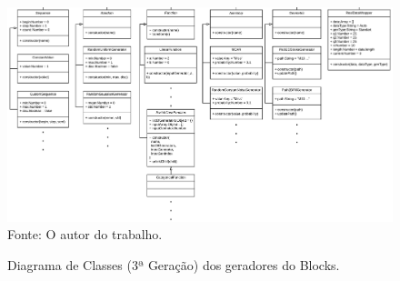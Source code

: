 \documentclass[
	12pt,				%
	openright,			%
	oneside,			%
	a4paper,			%
	english,			%
	brazil				%
	]{abntex2}
\begin{document}
	\begin{figure}[h!]
		\centering
		\caption{Diagrama de Classes (3ª Geração) dos geradores do Blocks.}
		\includegraphics[width=\linewidth]{./figures/prototipo/DiagramadeClasseGeradoresBaixo.png}
		\label{fig:diagramaCDBaixo}
		\footnotesize Fonte: O autor do trabalho.
	\end{figure}
\end{document}

